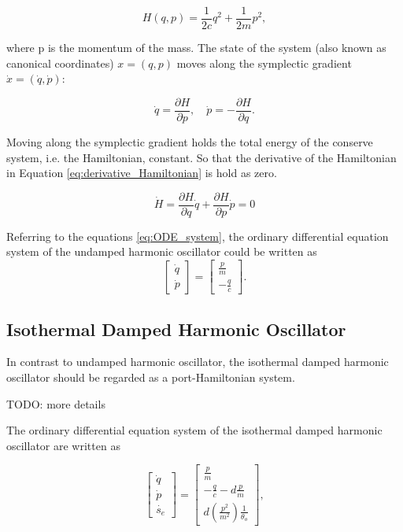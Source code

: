 \documentclass[
	parskip, 			   %
	twoside, 			   %
	DIV=14, 			   %
	BCOR=15.0mm, 		   %
	headsepline, 		   %
	open=right, 		   %
	captions=tableheading, %
	bibliography=totoc,    %
	numbers=noenddot       %
]{scrreprt}
\begin{document}
\begin{equation}
    \label{eq:Hamiltonian_udho}
    H(q,p)=\frac{1}{2c}q^2+\frac{1}{2m}p^2,
\end{equation}

where p is the momentum of the mass. The state of the system (also known as canonical coordinates) $x=(q,p)$ moves along the symplectic gradient $\dot{x}=(\dot{q},\dot{p})$:

\begin{equation}
    \label{eq:symplectic_gradient}
    \dot{q}=\frac{\partial H}{\partial p}, \quad \dot{p}=-\frac{\partial H}{\partial q}.
\end{equation}

Moving along the symplectic gradient holds the total energy of the conserve system, i.e. the Hamiltonian, constant. So that the derivative of the Hamiltonian in Equation \ref{eq:derivative_Hamiltonian} is hold as zero.

\begin{equation}
    \label{eq:derivative_Hamiltonian}
    \dot{H}=\frac{\partial H}{\partial q}\dot{q}+\frac{\partial H}{\partial p}\dot{p}=0
\end{equation}

Referring to the equations \ref{eq:ODE_system}, the ordinary differential equation system of the undamped harmonic oscillator could be written as
\begin{equation}
    \label{eq:ODE_undamped_harmonic_oscillator}
    \begin{bmatrix}
    \dot{q}\\
    \dot{p}
    \end{bmatrix}
    =
    \begin{bmatrix}
    \frac{p}{m}\\
    -\frac{q}{c}
    \end{bmatrix}.
\end{equation}

\subsection{Isothermal Damped Harmonic Oscillator}
In contrast to undamped harmonic oscillator, the isothermal damped harmonic oscillator should be regarded as a port-Hamiltonian system.

TODO: more details

The ordinary differential equation system of the isothermal damped harmonic oscillator are written as

\begin{equation}
    \label{eq:ODE_isothermal_damped_harmonic_oscillator}
    \begin{bmatrix}
    \dot{q}\\
    \dot{p}\\
    \dot{s_{e}}
    \end{bmatrix}
    =
    \begin{bmatrix}
    \frac{p}{m}\\
    -\frac{q}{c}-d\frac{p}{m}\\
    d(\frac{p^2}{m^2})\frac{1}{\theta_{o}}
    \end{bmatrix},
\end{equation}
\end{document}

